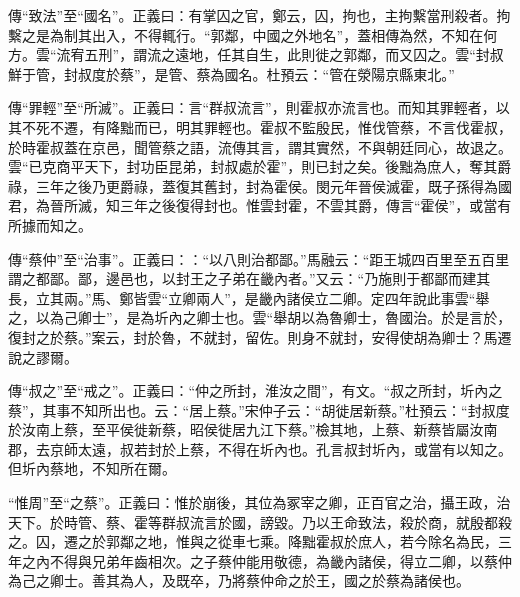 {\noindent\zhuan{}\fzbyks 傳“致法”至“國名”。正義曰：有掌囚之官，鄭云，囚，拘也，主拘繫當刑殺者。拘繫之是為制其出入，不得輒行。“郭鄰，中國之外地名”，蓋相傳為然，不知在何方。雲“流宥五刑”，謂流之遠地，任其自生，此則徙之郭鄰，而又囚之。雲“封叔鮮于管，封叔度於蔡”，是管、蔡為國名。杜預云：“管在滎陽京縣東北。” \par}

{\noindent\zhuan{}\fzbyks 傳“罪輕”至“所滅”。正義曰：言“群叔流言”，則霍叔亦流言也。而知其罪輕者，以其不死不遷，有降黜而已，明其罪輕也。霍叔不監殷民，惟伐管蔡，不言伐霍叔，於時霍叔蓋在京邑，聞管蔡之語，流傳其言，謂其實然，不與朝廷同心，故退之。雲“已克商平天下，封功臣昆弟，封叔處於霍”，則已封之矣。後黜為庶人，奪其爵祿，三年之後乃更爵祿，蓋復其舊封，封為霍侯。閔元年晉侯滅霍，既子孫得為國君，為晉所滅，知三年之後復得封也。惟雲封霍，不雲其爵，傳言“霍侯”，或當有所據而知之。 \par}

{\noindent\zhuan{}\fzbyks 傳“蔡仲”至“治事”。正義曰：：“以八則治都鄙。”馬融云：“距王城四百里至五百里謂之都鄙。鄙，邊邑也，以封王之子弟在畿內者。”又云：“乃施則于都鄙而建其長，立其兩。”馬、鄭皆雲“立卿兩人”，是畿內諸侯立二卿。定四年說此事雲“舉之，以為己卿士”，是為圻內之卿士也。雲“舉胡以為魯卿士，魯國治。於是言於，復封之於蔡。”案云，封於魯，不就封，留佐。則身不就封，安得使胡為卿士？馬遷說之謬爾。 \par}

{\noindent\zhuan{}\fzbyks 傳“叔之”至“戒之”。正義曰：“仲之所封，淮汝之間”，有文。“叔之所封，圻內之蔡”，其事不知所出也。云：“居上蔡。”宋仲子云：“胡徙居新蔡。”杜預云：“封叔度於汝南上蔡，至平侯徙新蔡，昭侯徙居九江下蔡。”檢其地，上蔡、新蔡皆屬汝南郡，去京師太遠，叔若封於上蔡，不得在圻內也。孔言叔封圻內，或當有以知之。但圻內蔡地，不知所在爾。 \par}

{\noindent\shu{}\fzkt “惟周”至“之蔡”。正義曰：惟於崩後，其位為冢宰之卿，正百官之治，攝王政，治天下。於時管、蔡、霍等群叔流言於國，謗毀。乃以王命致法，殺於商，就殷都殺之。囚，遷之於郭鄰之地，惟與之從車七乘。降黜霍叔於庶人，若今除名為民，三年之內不得與兄弟年齒相次。之子蔡仲能用敬德，為畿內諸侯，得立二卿，以蔡仲為己之卿士。善其為人，及既卒，乃將蔡仲命之於王，國之於蔡為諸侯也。 \par}

